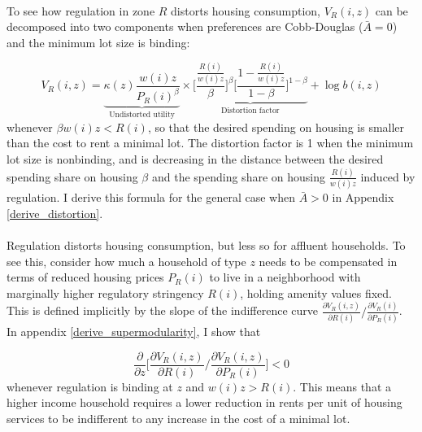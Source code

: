 \documentclass[12pt]{article}
\begin{document}
	\paragraph*{}
	To see how regulation in zone $R$ distorts housing consumption, $V_{R}(i, z)$ can be decomposed into two components when preferences are Cobb-Douglas ($\bar{A} = 0$) and the minimum lot size is binding:
	
	\begin{equation}\label{utilitydecomp}
		V_{R}(i, z) = \underbrace{\kappa(z)\frac{w(i)z}{P_{R}(i)^{\beta}}}_{\text{Undistorted utility}}  \times \underbrace{\biggl[\frac{\frac{R(i)}{w(i)z}}{\beta}\biggl]^{\beta}\biggl[\frac{1- \frac{R(i)}{w(i)z}}{1-\beta}\biggl]^{1 - \beta}}_{\text{Distortion factor}} + \log b(i, z)
	\end{equation}
	whenever $\beta w(i)z < R(i)$, so that the desired spending on housing is smaller than the cost to rent a minimal lot. The distortion factor is 1 when the minimum lot size is nonbinding, and is decreasing in the distance between the desired spending share on housing $\beta$ and the spending share on housing $\frac{R(i)}{w(i)z}$ induced by regulation. I derive this formula for the general case when $\bar{A} > 0$ in Appendix \ref{derive_distortion}. 
	
	\paragraph*{}
	Regulation distorts housing consumption, but less so for affluent households. To see this, consider how much a household of type $z$ needs to be compensated in terms of reduced housing prices $P_{R}(i)$ to live in a neighborhood with marginally higher regulatory stringency $R(i)$, holding amenity values fixed. This is defined implicitly by the slope of the indifference curve $\frac{\partial V_{R}(i, z)}{\partial R(i)}/\frac{\partial V_{R}(i)}{\partial P_{R}(i)}$. In appendix \ref{derive_supermodularity}, I show that 
	
	\begin{equation}\label{supermodularity}
		\frac{\partial}{\partial z}\bigg[\frac{\partial V_{R}(i, z)}{\partial R(i)}/\frac{\partial V_{R}(i, z)}{\partial P_{R}(i)}\bigg] < 0
	\end{equation}
	whenever regulation is binding at $z$ and $w(i)z > R(i)$. This means that a higher income household requires a lower reduction in rents per unit of housing services to be indifferent to any increase in the cost of a minimal lot. 
	
\end{document}
